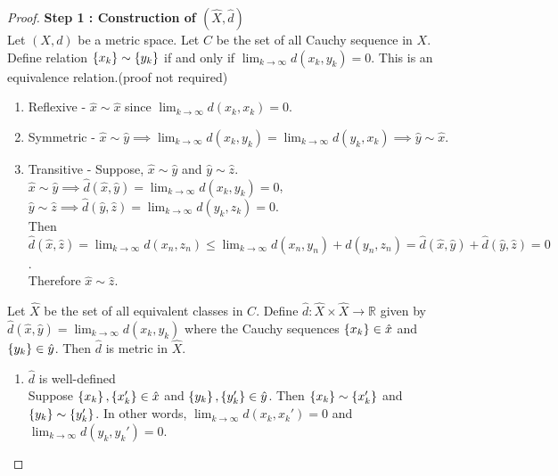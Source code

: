 \begin{proof}
	\textbf{Step 1 : Construction of $(\hat{X},\hat{d})$}\\
	Let $(X,d)$ be a metric space.
	Let $C$ be the set of all Cauchy sequence in $X$.
	Define relation $\left\{x_k\right\} \sim \left\{y_k\right\}$ if and only if $\displaystyle \lim_{k \to \infty} d(x_k,y_k) = 0$.
	This is an equivalence relation.(proof not required)

	\begin{commentary}
		{\footnotesize
		\begin{enumerate}
			\item Reflexive - $\displaystyle \hat{x} \sim \hat{x}$ since $\lim_{k \to \infty} d(x_k,x_k) = 0$. 
			\item Symmetric -  $\displaystyle \hat{x} \sim \hat{y} \implies \lim_{k \to \infty} d(x_k,y_k) = \lim_{k \to \infty} d(y_k,x_k) \implies \hat{y} \sim \hat{x}$.
		\item Transitive - Suppose, $\hat{x} \sim \hat{y}$ and $\hat{y} \sim \hat{z}$.\\
		$\displaystyle \hat{x} \sim \hat{y} \implies \hat{d}(\hat{x},\hat{y}) = \lim_{k \to \infty} d(x_k,y_k) = 0$, $\displaystyle \hat{y} \sim \hat{z} \implies \hat{d}(\hat{y},\hat{z}) = \lim_{k \to \infty} d(y_k,z_k) = 0$.\\
		Then $\displaystyle \hat{d}(\hat{x},\hat{z}) = \lim_{k \to \infty} d(x_n,z_n) \le \lim_{k \to \infty} d(x_n,y_n) + d(y_n,z_n) = \hat{d}(\hat{x},\hat{y}) + \hat{d}(\hat{y},\hat{z}) = 0$.\\
		Therefore $\hat{x} \sim \hat{z}$.
		\end{enumerate}
		}
	\end{commentary}

	Let $\hat{X}$ be the set of all equivalent classes in $C$.
	Define $\hat{d} : \hat{X} \times \hat{X} \to \mathbb{R}$ given by  $\displaystyle \hat{d}(\hat{x},\hat{y}) = \lim_{k \to \infty} d(x_k,y_k)$ where the Cauchy sequences $\left\{x_k\right\} \in \hat{x}$ and $\left\{y_k\right\} \in \hat{y}$.
	Then $\hat{d}$ is metric in $\hat{X}$.
	\begin{enumerate}
		\item $\hat{d}$ is well-defined\\
			Suppose $\left\{x_k\right\},\left\{x_k'\right\} \in \hat{x}$ and $\left\{y_k\right\},\left\{y_k'\right\} \in \hat{y}$.
			Then $\left\{x_k\right\} \sim \left\{x_k'\right\}$ and $\left\{y_k\right\} \sim \left\{y_k'\right\}$.
			In other words, $\displaystyle \lim_{k \to \infty} d(x_k,x_k') = 0$ and $\displaystyle \lim_{k \to \infty} d(y_k,y_k') = 0$.\\


\end{enumerate}
\end{proof}
